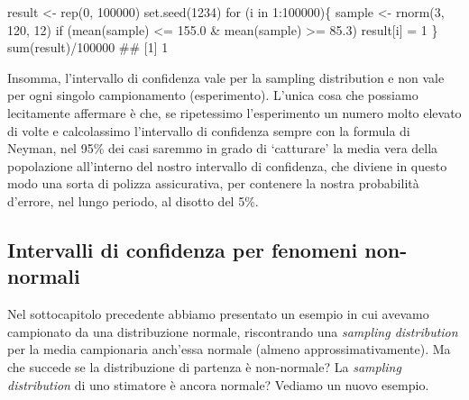 \documentclass[a4paper,12pt,oneside]{book}
\newenvironment{Shaded}{\begin{snugshade}}{\end{snugshade}}
\newcommand{\DecValTok}[1]{#1}
\newcommand{\FloatTok}[1]{#1}
\newcommand{\SpecialCharTok}[1]{#1}
\newcommand{\DocumentationTok}[1]{#1}
\newcommand{\OtherTok}[1]{#1}
\newcommand{\FunctionTok}[1]{#1}
\newcommand{\ControlFlowTok}[1]{#1}
\newcommand{\NormalTok}[1]{#1}
\begin{document}
\begin{Shaded}
\begin{Highlighting}[]
\NormalTok{result }\OtherTok{\textless{}{-}} \FunctionTok{rep}\NormalTok{(}\DecValTok{0}\NormalTok{, }\DecValTok{100000}\NormalTok{)}
\FunctionTok{set.seed}\NormalTok{(}\DecValTok{1234}\NormalTok{)}
\ControlFlowTok{for}\NormalTok{ (i }\ControlFlowTok{in} \DecValTok{1}\SpecialCharTok{:}\DecValTok{100000}\NormalTok{)\{}
\NormalTok{  sample }\OtherTok{\textless{}{-}} \FunctionTok{rnorm}\NormalTok{(}\DecValTok{3}\NormalTok{, }\DecValTok{120}\NormalTok{, }\DecValTok{12}\NormalTok{)}
  \ControlFlowTok{if}\NormalTok{ (}\FunctionTok{mean}\NormalTok{(sample) }\SpecialCharTok{\textless{}=} \FloatTok{155.0} \SpecialCharTok{\&} \FunctionTok{mean}\NormalTok{(sample) }\SpecialCharTok{\textgreater{}=} \FloatTok{85.3}\NormalTok{) result[i] }\OtherTok{=} \DecValTok{1}
\NormalTok{\}}
\FunctionTok{sum}\NormalTok{(result)}\SpecialCharTok{/}\DecValTok{100000}
\DocumentationTok{\#\# [1] 1}
\end{Highlighting}
\end{Shaded}

Insomma, l'intervallo di confidenza vale per la sampling distribution e non vale per ogni singolo campionamento (esperimento). L'unica cosa che possiamo lecitamente affermare è che, se ripetessimo l'esperimento un numero molto elevato di volte e calcolassimo l'intervallo di confidenza sempre con la formula di Neyman, nel 95\% dei casi saremmo in grado di `catturare' la media vera della popolazione all'interno del nostro intervallo di confidenza, che diviene in questo modo una sorta di polizza assicurativa, per contenere la nostra probabilità d'errore, nel lungo periodo, al disotto del 5\%.

\hypertarget{intervalli-di-confidenza-per-fenomeni-non-normali}{%
\subsection{Intervalli di confidenza per fenomeni non-normali}\label{intervalli-di-confidenza-per-fenomeni-non-normali}}

Nel sottocapitolo precedente abbiamo presentato un esempio in cui avevamo campionato da una distribuzione normale, riscontrando una \emph{sampling distribution} per la media campionaria anch'essa normale (almeno approssimativamente). Ma che succede se la distribuzione di partenza è non-normale? La \emph{sampling distribution} di uno stimatore è ancora normale? Vediamo un nuovo esempio.
\end{document}
